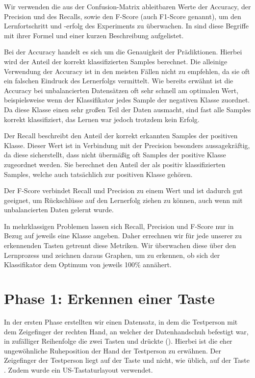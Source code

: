 Wir verwenden die aus der Confusion-Matrix ableitbaren Werte der Accuracy, der Precision und des Recalls, sowie den F-Score (auch F1-Score genannt), um den Lernfortschritt und -erfolg des Experiments zu überwachen. In  sind diese Begriffe mit ihrer Formel und einer kurzen Beschreibung aufgelistet.

Bei der Accuracy handelt es sich um die Genauigkeit der Prädiktionen. Hierbei wird der Anteil der korrekt klassifizierten Samples berechnet. Die alleinige Verwendung der Accuracy ist in den meisten Fällen nicht zu empfehlen, da sie oft ein falschen Eindruck des Lernerfolgs vermittelt. Wie bereits erwähnt ist die Accuracy bei unbalancierten Datensätzen oft sehr schnell am optimalen Wert, beispielsweise wenn der Klassifikator jedes Sample der negativen Klasse zuordnet. Da diese Klasse einen sehr großen Teil der Daten ausmacht, sind fast alle Samples korrekt klassifiziert, das Lernen war jedoch trotzdem kein Erfolg.

Der Recall beschreibt den Anteil der korrekt erkannten Samples der positiven Klasse. Dieser Wert ist in Verbindung mit der Precision besonders aussagekräftig, da diese sicher\-stellt, dass nicht übermäßig oft Samples der positive Klasse zugeordnet werden. Sie berechnet den Anteil der als positiv klassifizierten Samples, welche auch tatsächlich zur positiven Klasse gehören.

Der F-Score verbindet Recall und Precision zu einem Wert und ist dadurch gut geeignet, um Rückschlüsse auf den Lernerfolg ziehen zu können, auch wenn mit unbalancierten Daten gelernt wurde.

In mehrklassigen Problemen lassen sich Recall, Precision und F-Score nur in Bezug auf jeweils eine Klasse angeben. Daher errechnen wir für jede unserer zu erkennenden Tasten getrennt diese Metriken. Wir überwachen diese über den Lernprozess und zeichnen daraus Graphen, um zu erkennen, ob sich der Klassifikator dem Optimum von jeweils 100\% annähert.

\section{Phase 1: Erkennen einer Taste}

In der ersten Phase erstellten wir einen Datensatz, in dem die Testperson mit dem Zeigefinger der rechten Hand, an welcher der Datenhandschuh befestigt war, in zufälliger Reihenfolge die zwei Tasten  und  drückte (). Hierbei ist die eher ungewöhnliche Ruheposition der Hand der Testperson zu erwähnen. Der Zeigefinger der Testperson liegt auf der Taste  und nicht, wie üblich, auf der Taste . Zudem wurde ein US-Tastaturlayout verwendet.

